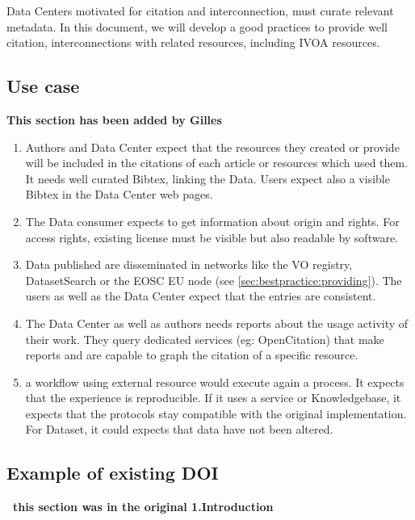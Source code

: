 \documentclass[11pt,a4paper]{ivoa}
\begin{document}
Data Centers motivated for citation and interconnection, must curate relevant metadata. 
In this document, we will develop a good practices to provide well citation, interconnections with related resources, including IVOA resources.


\subsection{Use case}
\textbf{\color{red}This section has been added by Gilles}

\begin{enumerate}
	\item Authors and Data Center expect that the resources they created or provide will be included in the citations of each article or resources which used them. It needs well curated Bibtex, linking the Data. Users expect also a visible Bibtex in the Data Center web pages.
	
	\item The Data consumer expects to get information about origin and rights. For access rights, existing license must be visible but also readable by software.
	
	\item Data published are disseminated in networks like the VO registry, DatasetSearch or the EOSC EU node (see \ref{sec:bestpractice:providing}). The users as well as the Data Center expect that the entries are consistent.
	
	\item The Data Center as well as authors needs reports about the usage activity of their work. They query dedicated services (eg: OpenCitation) that make reports and are capable to graph the citation of a specific resource.
	
	\item a workflow using external resource would execute again a process. It expects that the experience is reproducible. If it uses a service or Knowledgebase, it expects that the protocols stay compatible with the original implementation. For Dataset, it could expects that data have not been altered. 
	
	
\end{enumerate}

\subsection{Example of existing DOI}
\textbf{\color{red} this section was in the original 1.Introduction}
\end{document}
